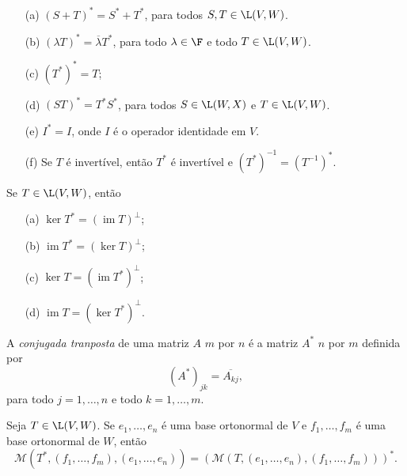 \documentclass{article}
\DeclareMathOperator{\im}{im}
\begin{document}
\begin{prop} 
    \begin{enumerate}
        \item [(a)] \((S + T)^* = S^* + T^*\), para todos \(S, T \in \L(V, W)\).
        \item [(b)] \((\lambda T)^* = \overline{\lambda} T^*\), para todo \(\lambda \in \F\) e todo \(T \in \L(V, W)\).
        \item [(c)] \((T^*)^* = T\);
        \item [(d)] \((ST)^* = T^* S^*\), para todos \(S \in \L(W, X)\) e \(T \in \L(V, W)\).
        \item [(e)] \(I^* = I\), onde \(I\) é o operador identidade em \(V\).
        \item [(f)] Se \(T\) é invertível, então \(T^*\) é invertível e \((T^*)^{-1} = (T^{-1})^*\).
    \end{enumerate}
\end{prop}

\begin{prop} 
    Se \(T \in \L(V, W)\), então
    \begin{enumerate}
        \item [(a)] \(\ker T^* = (\im T)^\perp\);
        \item [(b)] \(\im T^* = (\ker T)^\perp\);
        \item [(c)] \(\ker T = (\im T^*)^\perp\);
        \item [(d)] \(\im T = (\ker T^*)^\perp\).
    \end{enumerate}
\end{prop}

\begin{defn}
    A \emph{conjugada tranposta} de uma matriz \(A\) \(m\) por \(n\) é a matriz \(A^*\) \(n\) por \(m\) definida por
    \[
        (A^*)_{jk} = \overline{A_{kj}},
    \]
    \noindent para todo \(j = 1, \ldots, n\) e todo \(k = 1, \ldots, m\).
\end{defn}

\begin{prop}
    Seja \(T \in \L(V, W)\). Se \(e_1, \ldots, e_n\) é uma base ortonormal de \(V\) e \(f_1, \ldots, f_m\) é uma base ortonormal de \(W\), então
    \begin{equation}
        \mathcal{M}(T^*, (f_1, \ldots, f_m), (e_1, \ldots, e_n)) = (\mathcal{M}(T, (e_1, \ldots, e_n), (f_1, \ldots, f_m)))^*.
    \end{equation}
\end{prop}
\end{document}
